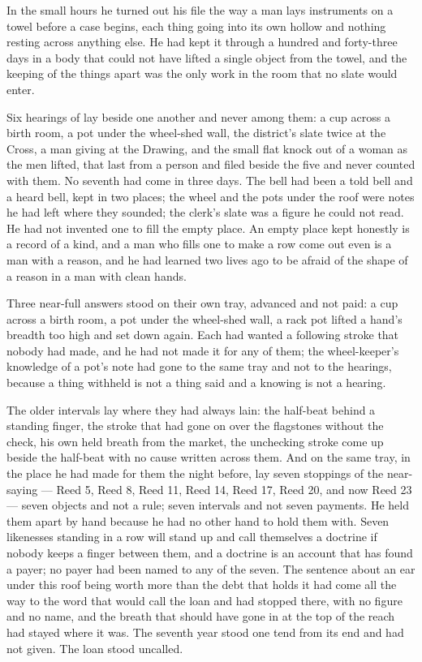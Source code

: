 \scenebreak

In the small hours he turned out his file the way a man lays instruments on a towel before a case begins, each thing going into its own hollow and nothing resting across anything else. He had kept it through a hundred and forty-three days in a body that could not have lifted a single object from the towel, and the keeping of the things apart was the only work in the room that no slate would enter.

Six hearings of  lay beside one another and never among them: a cup across a birth room, a pot under the wheel-shed wall, the district's slate twice at the Cross, a man giving at the Drawing, and the small flat knock out of a woman as the men lifted, that last from a person and filed beside the five and never counted with them. No seventh had come in three days. The bell had been a told bell and a heard bell, kept in two places; the wheel and the pots under the roof were notes he had left where they sounded; the clerk's slate was a figure he could not read. He had not invented one to fill the empty place. An empty place kept honestly is a record of a kind, and a man who fills one to make a row come out even is a man with a reason, and he had learned two lives ago to be afraid of the shape of a reason in a man with clean hands.

Three near-full answers stood on their own tray, advanced and not paid: a cup across a birth room, a pot under the wheel-shed wall, a rack pot lifted a hand's breadth too high and set down again. Each had wanted a following stroke that nobody had made, and he had not made it for any of them; the wheel-keeper's knowledge of a pot's note had gone to the same tray and not to the hearings, because a thing withheld is not a thing said and a knowing is not a hearing.

The older intervals lay where they had always lain: the half-beat behind a standing finger, the stroke that had gone on over the flagstones without the check, his own held breath from the market, the unchecking stroke come up beside the half-beat with no cause written across them. And on the same tray, in the place he had made for them the night before, lay seven stoppings of the near-saying --- Reed 5, Reed 8, Reed 11, Reed 14, Reed 17, Reed 20, and now Reed 23 --- seven objects and not a rule; seven intervals and not seven payments. He held them apart by hand because he had no other hand to hold them with. Seven likenesses standing in a row will stand up and call themselves a doctrine if nobody keeps a finger between them, and a doctrine is an account that has found a payer; no payer had been named to any of the seven. The sentence about an ear under this roof being worth more than the debt that holds it had come all the way to the word that would call the loan and had stopped there, with no figure and no name, and the breath that should have gone in at the top of the reach had stayed where it was. The seventh year stood one tend from its end and had not given. The loan stood uncalled.


